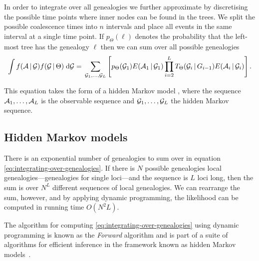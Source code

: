 In order to integrate over all genealogies we further approximate by discretising the possible time points where inner nodes can be found in the trees. We split the possible coalescence times into $n$ intervals and place all events in the same interval at a single time point. If $p_\Theta(\ell)$ denotes the probability that the left-most tree has the genealogy $\ell$ then we can sum over all possible genealogies
\begin{dmath}
    \label{eq:integrating-over-genealogies}
    \int f(\A\,|\,\G) f(\G\,|\,\Theta) \intd\G = \\
    \sum_{\G_1,\ldots,\G_L} \left[ 
        p_\Theta(\G_1) E(\A_1\,|\,\G_1) 
        \prod_{i=2}^L T_\Theta(\G_i\,|\,G_{i-1}) E(\A_i\,|\,\G_i)
    \right] .
\end{dmath}

This equation takes the form of a hidden Markov model \cite{Rabiner_1989}, where the sequence $\mathcal{A}_1,\ldots,\mathcal{A}_L$ is the observable sequence and $\mathcal{G}_1,\ldots,\mathcal{G}_L$ the hidden Markov sequence.

\subsection{Hidden Markov models}

There is an exponential number of genealogies to sum over in equation \eqref{eq:integrating-over-genealogies}. If there is $N$ possible genealogies local genealogies---genealogies for single loci---and the sequence is $L$ loci long, then the sum is over $N^L$ different sequences of local genealogies. We can rearrange the sum, however, and by applying dynamic programming, the likelihood can be computed in running time $O(N^2L)$.

The algorithm for computing \eqref{eq:integrating-over-genealogies} using dynamic programming is known as the \emph{Forward} algorithm and is part of a suite of algorithms for efficient inference in the framework known as hidden Markov models~\cite{Rabiner_1989,Durbin:2005wq}.

